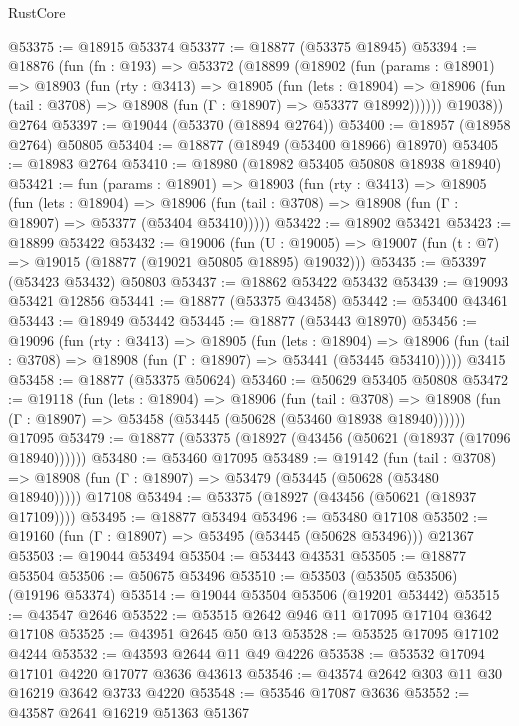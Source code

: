 \begin{lexlean}{RustCore}
\begin{coremodule}
@53375 := @18915 @53374
@53377 := @18877 (@53375 @18945)
@53394 := @18876
    (fun (fn : @193) =>
    @53372
      (@18899
        (@18902
          (fun (params : @18901) =>
          @18903
            (fun (rty : @3413) =>
            @18905
              (fun (lets : @18904) =>
              @18906 (fun (tail : @3708) => @18908 (fun (Γ : @18907) => @53377 @18992))))))
        @19038))
    @2764
@53397 := @19044 (@53370 (@18894 @2764))
@53400 := @18957 (@18958 @2764) @50805
@53404 := @18877 (@18949 (@53400 @18966) @18970)
@53405 := @18983 @2764
@53410 := @18980 (@18982 @53405 @50808 @18938 @18940)
@53421 := fun (params : @18901) =>
  @18903
    (fun (rty : @3413) =>
    @18905
      (fun (lets : @18904) =>
      @18906 (fun (tail : @3708) => @18908 (fun (Γ : @18907) => @53377 (@53404 @53410)))))
@53422 := @18902 @53421
@53423 := @18899 @53422
@53432 := @19006
    (fun (U : @19005) => @19007 (fun (t : @7) => @19015 (@18877 (@19021 @50805 @18895) @19032)))
@53435 := @53397 (@53423 @53432) @50803
@53437 := @18862 @53422 @53432
@53439 := @19093 @53421 @12856
@53441 := @18877 (@53375 @43458)
@53442 := @53400 @43461
@53443 := @18949 @53442
@53445 := @18877 (@53443 @18970)
@53456 := @19096
    (fun (rty : @3413) =>
    @18905
      (fun (lets : @18904) =>
      @18906 (fun (tail : @3708) => @18908 (fun (Γ : @18907) => @53441 (@53445 @53410)))))
    @3415
@53458 := @18877 (@53375 @50624)
@53460 := @50629 @53405 @50808
@53472 := @19118
    (fun (lets : @18904) =>
    @18906
      (fun (tail : @3708) =>
      @18908 (fun (Γ : @18907) => @53458 (@53445 (@50628 (@53460 @18938 @18940))))))
    @17095
@53479 := @18877 (@53375 (@18927 (@43456 (@50621 (@18937 (@17096 @18940))))))
@53480 := @53460 @17095
@53489 := @19142
    (fun (tail : @3708) => @18908 (fun (Γ : @18907) => @53479 (@53445 (@50628 (@53480 @18940)))))
    @17108
@53494 := @53375 (@18927 (@43456 (@50621 (@18937 @17109))))
@53495 := @18877 @53494
@53496 := @53480 @17108
@53502 := @19160 (fun (Γ : @18907) => @53495 (@53445 (@50628 @53496))) @21367
@53503 := @19044 @53494
@53504 := @53443 @43531
@53505 := @18877 @53504
@53506 := @50675 @53496
@53510 := @53503 (@53505 @53506) (@19196 @53374)
@53514 := @19044 @53504 @53506 (@19201 @53442)
@53515 := @43547 @2646
@53522 := @53515 @2642 @946 @11 @17095 @17104 @3642 @17108
@53525 := @43951 @2645 @50 @13
@53528 := @53525 @17095 @17102 @4244
@53532 := @43593 @2644 @11 @49 @4226
@53538 := @53532 @17094 @17101 @4220 @17077 @3636 @43613
@53546 := @43574 @2642 @303 @11 @30 @16219 @3642 @3733 @4220
@53548 := @53546 @17087 @3636
@53552 := @43587 @2641 @16219 @51363 @51367

\end{coremodule}
\end{lexlean}
